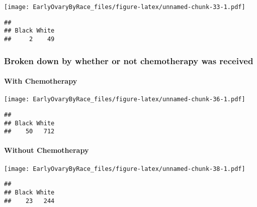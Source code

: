 \documentclass[
]{article}
\newenvironment{Shaded}{\begin{snugshade}}{\end{snugshade}}
\newcommand{\KeywordTok}[1]{\textcolor[rgb]{0.13,0.29,0.53}{\textbf{#1}}}
\newcommand{\NormalTok}[1]{#1}
\newcommand{\OperatorTok}[1]{\textcolor[rgb]{0.81,0.36,0.00}{\textbf{#1}}}
\begin{document}
\texttt{[image: EarlyOvaryByRace\_files/figure-latex/unnamed-chunk-33-1.pdf]}

\begin{Shaded}
\end{Shaded}

\begin{verbatim}
## 
## Black White 
##     2    49
\end{verbatim}

\hypertarget{broken-down-by-whether-or-not-chemotherapy-was-received-1}{%
\subsubsection{Broken down by whether or not chemotherapy was
received}\label{broken-down-by-whether-or-not-chemotherapy-was-received-1}}

\hypertarget{with-chemotherapy-1}{%
\paragraph{With Chemotherapy}\label{with-chemotherapy-1}}

\texttt{[image: EarlyOvaryByRace\_files/figure-latex/unnamed-chunk-36-1.pdf]}

\begin{Shaded}
\end{Shaded}

\begin{verbatim}
## 
## Black White 
##    50   712
\end{verbatim}

\hypertarget{without-chemotherapy-1}{%
\paragraph{Without Chemotherapy}\label{without-chemotherapy-1}}

\texttt{[image: EarlyOvaryByRace\_files/figure-latex/unnamed-chunk-38-1.pdf]}

\begin{Shaded}
\end{Shaded}

\begin{verbatim}
## 
## Black White 
##    23   244
\end{verbatim}
\end{document}
